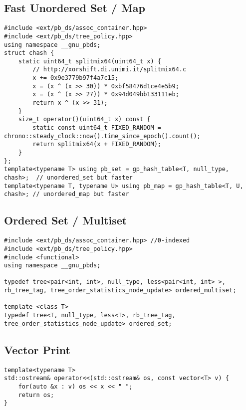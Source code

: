 \documentclass[8pt, headheight=10pt, a4paper]{article}
\begin{document}
\begin{multicols*}{3}
\begin{lstlisting}
\end{lstlisting}

\subsection{Fast Unordered Set / Map}
\begin{lstlisting}
#include <ext/pb_ds/assoc_container.hpp>
#include <ext/pb_ds/tree_policy.hpp>
using namespace __gnu_pbds;
struct chash {
    static uint64_t splitmix64(uint64_t x) {
        // http://xorshift.di.unimi.it/splitmix64.c
        x += 0x9e3779b97f4a7c15;
        x = (x ^ (x >> 30)) * 0xbf58476d1ce4e5b9;
        x = (x ^ (x >> 27)) * 0x94d049bb133111eb;
        return x ^ (x >> 31);
    }
    size_t operator()(uint64_t x) const {
        static const uint64_t FIXED_RANDOM = chrono::steady_clock::now().time_since_epoch().count();
        return splitmix64(x + FIXED_RANDOM);
    }
};
template<typename T> using pb_set = gp_hash_table<T, null_type, chash>;  // unordered_set but faster
template<typename T, typename U> using pb_map = gp_hash_table<T, U, chash>; // unordered_map but faster
\end{lstlisting}

\subsection{Ordered Set / Multiset}
\begin{lstlisting}
#include <ext/pb_ds/assoc_container.hpp> //0-indexed
#include <ext/pb_ds/tree_policy.hpp>
#include <functional>
using namespace __gnu_pbds;

typedef tree<pair<int, int>, null_type, less<pair<int, int> >, rb_tree_tag, tree_order_statistics_node_update> ordered_multiset;

template <class T>
typedef tree<T, null_type, less<T>, rb_tree_tag, tree_order_statistics_node_update> ordered_set;
\end{lstlisting}

\subsection{Vector Print}
\begin{lstlisting}
template<typename T>
std::ostream& operator<<(std::ostream& os, const vector<T> v) {
    for(auto &x : v) os << x << " ";
    return os;
}
\end{lstlisting}

\end{multicols*}
\end{document}
